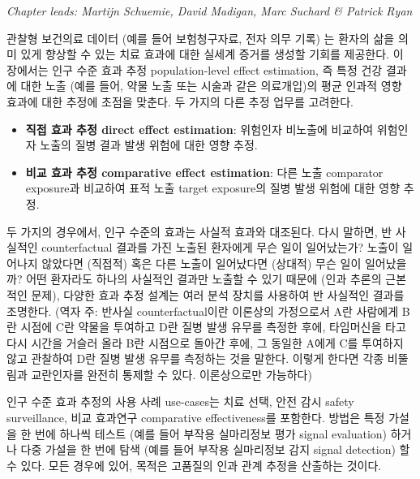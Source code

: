\documentclass[10.5pt]{book}
\providecommand{\tightlist}{%
  \setlength{\itemsep}{0pt}\setlength{\parskip}{0pt}}
\theoremstyle{definition}
\theoremstyle{definition}
\theoremstyle{definition}
\theoremstyle{remark}
\begin{document}
\emph{Chapter leads: Martijn Schuemie, David Madigan, Marc Suchard \&
Patrick Ryan}


관찰형 보건의료 데이터 (예를 들어 보험청구자료, 전자 의무 기록) 는
환자의 삶을 의미 있게 향상할 수 있는 치료 효과에 대한 실세계 증거를
생성할 기회를 제공한다. 이 장에서는 인구 수준 효과 추정 population-level
effect estimation, 즉 특정 건강 결과에 대한 노출 (예를 들어, 약물 노출
또는 시술과 같은 의료개입)의 평균 인과적 영향 효과에 대한 추정에 초점을
맞춘다. 두 가지의 다른 추정 업무를 고려한다.

\begin{itemize}
\tightlist
\item
  \textbf{직접 효과 추정 direct effect estimation}: 위험인자 비노출에
  비교하여 위험인자 노출의 질병 결과 발생 위험에 대한 영향 추정.
\item
  \textbf{비교 효과 추정 comparative effect estimation}: 다른 노출
  comparator exposure과 비교하여 표적 노출 target exposure의 질병 발생
  위험에 대한 영향 추정. 
\end{itemize}

두 가지의 경우에서, 인구 수준의 효과는 사실적 효과와 대조된다. 다시
말하면, 반 사실적인 counterfactual 결과를 가진 노출된 환자에게 무슨 일이
일어났는가? 노출이 일어나지 않았다면 (직접적) 혹은 다른 노출이
일어났다면 (상대적) 무슨 일이 일어났을까? 어떤 환자라도 하나의 사실적인
결과만 노출할 수 있기 때문에 (인과 추론의 근본적인 문제), 다양한 효과
추정 설계는 여러 분석 장치를 사용하여 반 사실적인 결과를 조명한다. (역자
주: 반사실 counterfactual이란 이론상의 가정으로서 A란 사람에게 B란
시점에 C란 약물을 투여하고 D란 질병 발생 유무를 측정한 후에, 타임머신을
타고 다시 시간을 거슬러 올라 B란 시점으로 돌아간 후에, 그 동일한 A에게
C를 투여하지 않고 관찰하여 D란 질병 발생 유무를 측정하는 것을 말한다.
이렇게 한다면 각종 비뚤림과 교란인자를 완전히 통제할 수 있다.
이론상으로만 가능하다) 

인구 수준 효과 추정의 사용 사례 use-cases는 치료 선택, 안전 감시 safety
surveillance, 비교 효과연구 comparative effectiveness를 포함한다. 방법은
특정 가설을 한 번에 하나씩 테스트 (예를 들어 부작용 실마리정보 평가
signal evaluation) 하거나 다중 가설을 한 번에 탐색 (예를 들어 부작용
실마리정보 감지 signal detection) 할 수 있다. 모든 경우에 있어, 목적은
고품질의 인과 관계 추정을 산출하는 것이다. 
\end{document}
